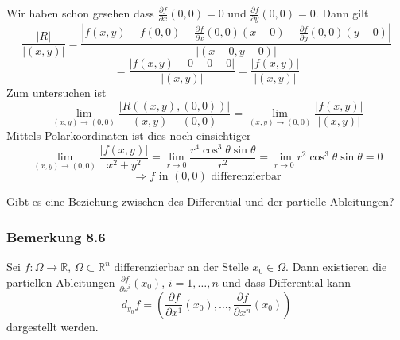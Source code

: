 \begin{enumerate}[\indent a)]
Wir haben schon gesehen dass $\frac{\partial f}{\partial x}\left( 0,0\right)=0$ und $\frac{\partial f}{\partial y}\left( 0,0\right)=0$. Dann gilt \[\frac{{\left| R \right|}}{{\left| {\left( {x,y} \right)} \right|}} = \frac{{\left| {f\left( {x,y} \right) - f\left( {0,0} \right) - \frac{{\partial f}}{{\partial x}}\left( {0,0} \right)\left( {x - 0} \right) - \frac{{\partial f}}{{\partial y}}\left( {0,0} \right)\left( {y - 0} \right)} \right|}}{{\left| {\left( {x - 0,y - 0} \right)} \right|}}\] \[ = \frac{{\left| {f\left( {x,y} \right) - 0 - 0 - 0} \right|}}{{\left| {\left( {x,y} \right)} \right|}} = \frac{{\left| {f\left( {x,y} \right)} \right|}}{{\left| {\left( {x,y} \right)} \right|}}\] 
Zum untersuchen ist 
\[\mathop {\lim }\limits_{\left( {x,y} \right) \to \left( {0,0} \right)}  \frac{{\left| {R\left( {\left( {x,y} \right),\left( {0,0} \right)} \right)} \right|}}{{\left( {x,y} \right) - \left( {0,0} \right)}} = \mathop {\lim }\limits_{\left( {x,y} \right) \to \left( {0,0} \right)} \frac{{\left| {f\left( {x,y} \right)} \right|}}{{\left| {\left( {x,y} \right)} \right|}}\]
Mittels Polarkoordinaten ist dies noch einsichtiger 
\[\mathop {\lim }\limits_{\left( {x,y} \right) \to \left( {0,0} \right)} \frac{{\left| {f\left( {x,y} \right)} \right|}}{{{x^2} + {y^2}}} = \mathop {\lim }\limits_{r \to 0} \frac{{{r^4}{{\cos }^3}\theta \sin \theta }}{{{r^2}}} = \mathop {\lim }\limits_{r \to 0} {r^2}{\cos ^3}\theta \sin \theta  = 0\] $$\Rightarrow f\text{ in }\left( 0,0\right)\text{ differenzierbar}$$
\end{enumerate}

\noindent Gibt es eine Beziehung zwischen des Differential und der partielle Ableitungen?

\subsubsection*{Bemerkung 8.6}

Sei $f:\Omega\rightarrow\mathbb{R}$, $\Omega\subset\mathbb{R}^n$ differenzierbar an der Stelle $x_0\in\Omega$. Dann existieren die partiellen Ableitungen $\frac{\partial f}{\partial x^i}\left( x_0\right)$, $i=1,\dots,n$ und dass Differential kann \[{d_{{y_0}}}f = \left( {\frac{{\partial f}}{{\partial {x^1}}}\left( {{x_0}} \right), \ldots ,\frac{{\partial f}}{{\partial {x^n}}}\left( {{x_0}} \right)} \right)\] dargestellt werden. 

